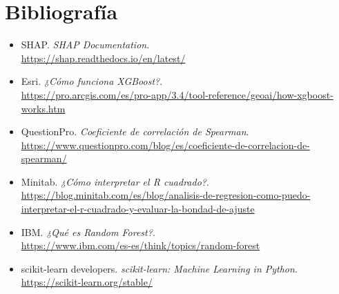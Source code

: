 \section*{Bibliografía}

\begin{itemize}[label={}]
    \item SHAP. \textit{SHAP Documentation}. \\
    \url{https://shap.readthedocs.io/en/latest/}
    
    \item Esri. \textit{¿Cómo funciona XGBoost?}. \\
    \url{https://pro.arcgis.com/es/pro-app/3.4/tool-reference/geoai/how-xgboost-works.htm}
    
    \item QuestionPro. \textit{Coeficiente de correlación de Spearman}. \\
    \url{https://www.questionpro.com/blog/es/coeficiente-de-correlacion-de-spearman/}
    
    \item Minitab. \textit{¿Cómo interpretar el R cuadrado?}. \\
    \url{https://blog.minitab.com/es/blog/analisis-de-regresion-como-puedo-interpretar-el-r-cuadrado-y-evaluar-la-bondad-de-ajuste}
    
    \item IBM. \textit{¿Qué es Random Forest?}. \\
    \url{https://www.ibm.com/es-es/think/topics/random-forest}
    
    \item scikit-learn developers. \textit{scikit-learn: Machine Learning in Python}. \\
    \url{https://scikit-learn.org/stable/}
\end{itemize}